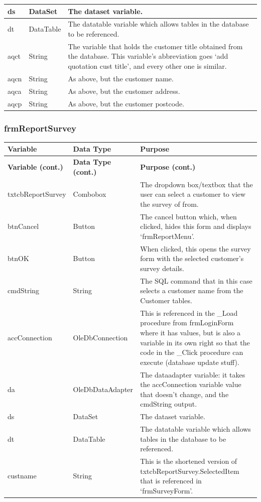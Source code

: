 \begin{longtable}{ | p{4cm} | p{3cm} | p{10cm} |}
		\hline
		ds & DataSet & The dataset variable.\\
		\hline
		dt & DataTable & The datatable variable which allows tables in the database to be referenced.\\
		\hline
		aqct & String & The variable that holds the customer title obtained from the database.  This variable's abbreviation goes `add quotation cust title', and every other one is similar.\\
		\hline
		aqcn & String & As above, but the customer name.\\
		\hline
		aqca & String & As above, but the customer address.\\
		\hline
		aqcp & String & As above, but the customer postcode.\\
		\hline
	\end{longtable}
	
	\subsubsection{frmReportSurvey}
	\begin{longtable}{ | p{4cm} | p{3cm} | p{10cm} |}
		\hline
		\textbf{Variable} & \textbf{Data Type} & \textbf{Purpose}\\
		\endfirsthead
		\hline
		\textbf{Variable (cont.)} & \textbf{Data Type (cont.)} & \textbf{Purpose (cont.)}\\
		\endhead
		\hline
		txtcbReportSurvey & Combobox & The dropdown box\slash textbox that the user can select a customer to view the survey of from.\\
		\hline
		btnCancel & Button & The cancel button which, when clicked, hides this form and displays `frmReportMenu'.\\
		\hline
		btnOK & Button & When clicked, this opens the survey form with the selected customer's survey details.\\
		\hline
		cmdString & String & The SQL command that in this case selects a customer name from the Customer tables.\\
		\hline
		accConnection & OleDbConnection & This is referenced in the \_Load procedure from frmLoginForm where it has values, but is also a variable in its own right so that the code in the \_Click procedure can execute (database update stuff).\\
		\hline
		da & OleDbDataAdapter & The dataadapter variable: it takes the accConnection variable value that doesn't change, and the cmdString output.\\
		\hline
		ds & DataSet & The dataset variable.\\
		\hline
		dt & DataTable & The datatable variable which allows tables in the database to be referenced.\\
		\hline
		custname & String & This is the shortened version of txtcbReportSurvey.SelectedItem that is referenced in `frmSurveyForm'.\\
		\hline
\end{longtable}
	
